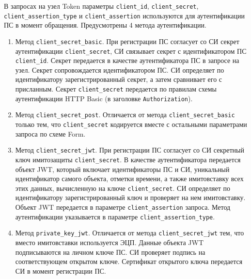 В запросах на узел Token параметры \lstinline{client_id}, 
\lstinline{client_secret}, \lstinline{client_assertion_type} и 
\lstinline{client_assertion} используются для аутентификации ПС в момент 
обращения.
%
Предусмотрены 4 метода аутентификации.

\begin{enumerate}
\item
Метод \lstinline{client_secret_basic}.
%
При регистрации ПС согласует со СИ секрет аутентификации 
\lstinline{client_secret}, СИ связывает секрет с идентификатором ПС 
\lstinline{client_id}.
%
Секрет передается в качестве аутентификатора ПС в запросе на узел.
Секрет сопровождается идентификатором ПС.
%
СИ определяет по идентификатору зарегистрированный секрет, а затем сравнивает  
его с присланным. 
%
Секрет \lstinline{client_secret} передается по правилам схемы аутентификации 
HTTP Basic (в заголовке \lstinline{Authorization}).

\item
Метод \lstinline{client_secret_post}.
%
Отличается от метода \lstinline{client_secret_basic} только тем, что 
\lstinline{client_secret} кодируется вместе с остальными параметрами 
запроса по схеме Form.

\item
Метод \lstinline{client_secret_jwt}.
%
При регистрации ПС согласует со СИ секретный ключ имитозащиты
\lstinline{client_secret}.
%
В качестве аутентификатора передается объект JWT, который включает 
идентификаторы ПС и СИ, уникальный идентификатор самого объекта, отметки 
времени, а также имитовставку всех этих данных, вычисленную на ключе 
\lstinline{client_secret}.
%
СИ определяет по идентификатору зарегистрированный ключ и проверяет на нем 
имитовставку.  
%
Объект JWT передается в параметре \lstinline{client_assertion} запроса.
%
Метод аутентификации указывается в параметре \lstinline{client_assertion_type}.

\item
Метод \lstinline{private_key_jwt}.
%
Отличается от метода \lstinline{client_secret_jwt} тем, что вместо имитовставки 
используется ЭЦП. 
%
Данные объекта JWT подписываются на личном ключе ПС. СИ проверяет подпись 
на соответствующем открытом ключе. Сертификат открытого ключа передается СИ в 
момент регистрации ПС.
\end{enumerate}

